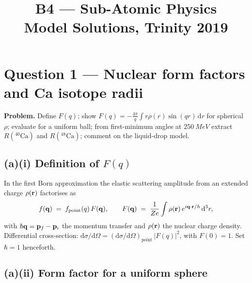 \documentclass[11pt]{article}
\title{B4 --- Sub-Atomic Physics \\ Model Solutions, Trinity 2019}
\author{}
\date{}
\newcommand{\de}{\mathrm{d}}
\begin{document}
\maketitle

\section*{Question 1 --- Nuclear form factors and Ca isotope radii}

\textbf{Problem.} Define $F(q)$; show $F(q)=-\tfrac{4\pi}{q}\!\int r\rho(r)\sin(qr)\,\de r$ for spherical $\rho$; evaluate for a uniform ball; from first-minimum angles at $\SI{250}{MeV}$ extract $R(^{40}\!\text{Ca})$ and $R(^{48}\!\text{Ca})$; comment on the liquid-drop model.

\subsection*{(a)(i) Definition of $F(q)$}

In the first Born approximation the elastic scattering amplitude from an extended charge $\rho(\vb r)$ factorises as
\begin{equation}
f(\vb q)\;=\;f_\text{point}(q)\,F(\vb q),\qquad F(\vb q)\;=\;\frac{1}{Ze}\int\rho(\vb r)\,e^{i\vb q\cdot\vb r/\hbar}\,\de^{3}r,
\label{eq:F-def}
\end{equation}
with $\hbar\vb q=\vb p_f-\vb p_i$ the momentum transfer and $\rho(\vb r)$ the nuclear charge density. Differential cross-section: $\de\sigma/\de\Omega=(\de\sigma/\de\Omega)_\text{point}\,|F(q)|^{2}$, with $F(0)=1$. Set $\hbar=1$ henceforth.

\subsection*{(a)(ii) Form factor for a uniform sphere}
\end{document}
